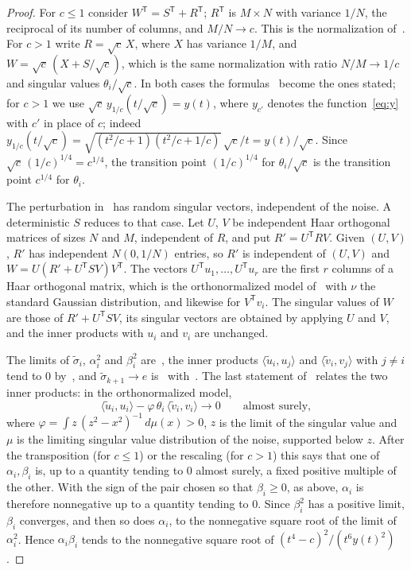 \documentclass[11pt]{amsart}
\theoremstyle{remark}
\numberwithin{equation}{section}
\begin{document}
\begin{proof}
For $c\le1$ consider $W^{\mathsf T}=S^{\mathsf T}+R^{\mathsf T}$; $R^{\mathsf T}$ is $M\times N$ with variance $1/N$, the reciprocal of its number of columns, and $M/N\to c$. This is the normalization of~\cite[Section~3.1]{BGN}. For $c>1$ write $R=\sqrt c\,X$, where $X$ has variance $1/M$, and $W=\sqrt c\,(X+S/\sqrt c)$, which is the same normalization with ratio $N/M\to1/c$ and singular values $\theta_i/\sqrt c$. In both cases the formulas~\cite[(9)--(11)]{BGN} become the ones stated; for $c>1$ we use $\sqrt c\,y_{1/c}(t/\sqrt c)=y(t)$, where $y_{c'}$ denotes the function~\eqref{eq:y} with $c'$ in place of $c$; indeed $y_{1/c}(t/\sqrt c)=\sqrt{(t^2/c+1)(t^2/c+1/c)}\,\sqrt c/t=y(t)/\sqrt c$. Since $\sqrt c\,(1/c)^{1/4}=c^{1/4}$, the transition point $(1/c)^{1/4}$ for $\theta_i/\sqrt c$ is the transition point $c^{1/4}$ for $\theta_i$.

The perturbation in~\cite{BGN} has random singular vectors, independent of the noise. A deterministic $S$ reduces to that case. Let $U$, $V$ be independent Haar orthogonal matrices of sizes $N$ and $M$, independent of $R$, and put $R'=U^{\mathsf T}RV$. Given $(U,V)$, $R'$ has independent $N(0,1/N)$ entries, so $R'$ is independent of $(U,V)$ and $W=U(R'+U^{\mathsf T}SV)V^{\mathsf T}$. The vectors $U^{\mathsf T}u_1,\dots,U^{\mathsf T}u_r$ are the first $r$ columns of a Haar orthogonal matrix, which is the orthonormalized model of~\cite[Section~2.1]{BGN} with $\nu$ the standard Gaussian distribution, and likewise for $V^{\mathsf T}v_i$. The singular values of $W$ are those of $R'+U^{\mathsf T}SV$, its singular vectors are obtained by applying $U$ and $V$, and the inner products with $u_i$ and $v_i$ are unchanged.

The limits of $\tilde\sigma_i$, $\alpha_i^2$ and $\beta_i^2$ are~\cite[Theorems~2.8 and~2.9(a), (b)]{BGN}, the inner products $\langle\tilde u_i,u_j\rangle$ and $\langle\tilde v_i,v_j\rangle$ with $j\ne i$ tend to $0$ by~\cite[Theorem~2.9(c)]{BGN}, and $\tilde\sigma_{k+1}\to e$ is~\cite[Theorem~2.8]{BGN} with~\cite{Geman}. The last statement of~\cite[Theorem~2.9(c)]{BGN} relates the two inner products: in the orthonormalized model,
\[
\langle\tilde u_i,u_i\rangle-\varphi\,\theta_i\,\langle\tilde v_i,v_i\rangle\to0\qquad\text{almost surely},
\]
where $\varphi=\int z\,(z^2-x^2)^{-1}\,d\mu(x)>0$, $z$ is the limit of the singular value and $\mu$ is the limiting singular value distribution of the noise, supported below $z$. After the transposition (for $c\le1$) or the rescaling (for $c>1$) this says that one of $\alpha_i,\beta_i$ is, up to a quantity tending to $0$ almost surely, a fixed positive multiple of the other. With the sign of the pair chosen so that $\beta_i\ge0$, as above, $\alpha_i$ is therefore nonnegative up to a quantity tending to $0$. Since $\beta_i^2$ has a positive limit, $\beta_i$ converges, and then so does $\alpha_i$, to the nonnegative square root of the limit of $\alpha_i^2$. Hence $\alpha_i\beta_i$ tends to the nonnegative square root of $(t^4-c)^2/(t^6y(t)^2)$.
\end{proof}
\end{document}
